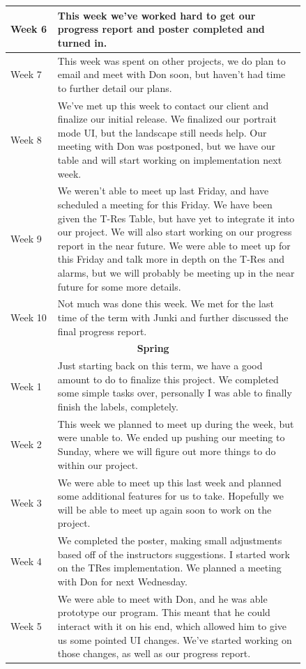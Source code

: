 \documentclass[onecolumn, draftclsnofoot,10pt, compsoc]{IEEEtran}
\begin{document}
\begin{center}
\begin{longtable}{| l | p{0.84\linewidth}|}
  Week 6 & This week we've worked hard to get our progress report and poster completed and turned in. \\ \hline
	Week 7 & This week was spent on other projects, we do plan to email and meet with Don soon, but haven't had time to further detail our plans. \\ \hline
	Week 8 & We've met up this week to contact our client and finalize our initial release.  We finalized our portrait mode UI, but the landscape still needs help.  Our meeting with Don was postponed, but we have our table and will start working on implementation next week. \\ \hline
	Week 9 & We weren't able to meet up last Friday, and have scheduled a meeting for this Friday.  We have been given the T-Res Table, but have yet to integrate it into our project.  We will also start working on our progress report in the near future. We were able to meet up for this Friday and talk more in depth on the T-Res and alarms, but we will probably be meeting up in the near future for some more details.  \\ \hline
    Week 10 & Not much was done this week.  We met for the last time of the term with Junki and further discussed the final progress report. \\ \hline
    \multicolumn{2}{c}{\textbf{Spring}} \\ \hline
    Week 1 &  Just starting back on this term, we have a good amount to do to finalize this project.  We completed some simple tasks over, personally I was able to finally finish the labels, completely. \\ \hline
	Week 2 & This week we planned to meet up during the week, but were unable to.  We ended up pushing our meeting to Sunday, where we will figure out more things to do within our project.  \\ \hline
	Week 3 & We were able to meet up this last week and planned some additional features for us to take.  Hopefully we will be able to meet up again soon to work on the project.  \\ \hline
	Week 4 & We completed the poster, making small adjustments based off of the instructors suggestions.  I started work on the TRes implementation.  We planned a meeting with Don for next Wednesday.  \\ \hline
    Week 5 & We were able to meet with Don, and he was able prototype our program.  This meant that he could interact with it on his end, which allowed him to give us some pointed UI changes.  We've started working on those changes, as well as our progress report. \\ \hline

\end{longtable}
\end{center}
\end{document}
